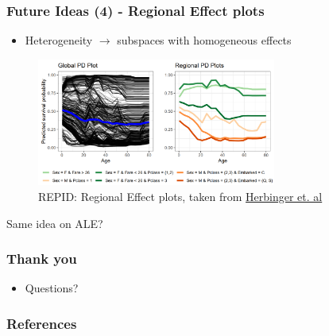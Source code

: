 \documentclass{beamer}
\begin{document}
\begin{frame}
  \frametitle{Future Ideas (4) - Regional Effect plots}
  \begin{itemize}
    \item Heterogeneity $\rightarrow$ subspaces with homogeneous effects
  \end{itemize}

  \begin{figure}
    \centering
    \includegraphics[width=0.7\textwidth]{figures/repid}
    \caption{REPID: Regional Effect plots, taken from \href{https://arxiv.org/abs/2202.07254}{Herbinger et. al}}
  \end{figure}
  \noindent\makebox[\linewidth]{\rule{\paperwidth}{0.4pt}}
  Same idea on ALE?
\end{frame}




\begin{frame}
  \frametitle{Thank you}
  \begin{itemize}
  \item Questions?
  \end{itemize}

\end{frame}



\begin{frame}[allowframebreaks]
  \frametitle{References}
  \printbibliography
\end{frame}
\end{document}
